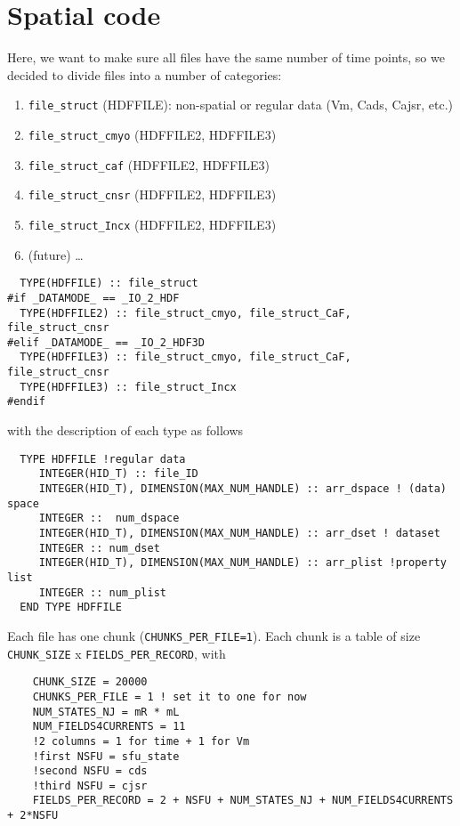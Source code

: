 \section{Spatial code}
\label{sec:IO_spatial}

Here, we want to make sure all files have the same number of time points, so we
decided to divide files into a number of categories:
\begin{enumerate}
  \item \verb!file_struct! (HDFFILE): non-spatial or regular data (Vm, Cads,
  Cajsr, etc.)
  \item \verb!file_struct_cmyo! (HDFFILE2, HDFFILE3)
  \item \verb!file_struct_caf! (HDFFILE2, HDFFILE3)
  \item \verb!file_struct_cnsr! (HDFFILE2, HDFFILE3)
  \item \verb!file_struct_Incx! (HDFFILE2, HDFFILE3)
  \item (future) \ldots 
\end{enumerate}
\begin{verbatim}
  TYPE(HDFFILE) :: file_struct
#if _DATAMODE_ == _IO_2_HDF  
  TYPE(HDFFILE2) :: file_struct_cmyo, file_struct_CaF, file_struct_cnsr
#elif _DATAMODE_ == _IO_2_HDF3D
  TYPE(HDFFILE3) :: file_struct_cmyo, file_struct_CaF, file_struct_cnsr
  TYPE(HDFFILE3) :: file_struct_Incx
#endif
\end{verbatim}
with the description of each type as follows
\begin{verbatim}
  TYPE HDFFILE !regular data
     INTEGER(HID_T) :: file_ID
     INTEGER(HID_T), DIMENSION(MAX_NUM_HANDLE) :: arr_dspace ! (data) space
     INTEGER ::  num_dspace
     INTEGER(HID_T), DIMENSION(MAX_NUM_HANDLE) :: arr_dset ! dataset
     INTEGER :: num_dset
     INTEGER(HID_T), DIMENSION(MAX_NUM_HANDLE) :: arr_plist !property list
     INTEGER :: num_plist
  END TYPE HDFFILE
\end{verbatim}

Each file has one chunk (\verb!CHUNKS_PER_FILE=1!). Each chunk is a table of
size \verb!CHUNK_SIZE! x \verb!FIELDS_PER_RECORD!, with
\begin{verbatim}
    CHUNK_SIZE = 20000
    CHUNKS_PER_FILE = 1 ! set it to one for now
    NUM_STATES_NJ = mR * mL
    NUM_FIELDS4CURRENTS = 11
    !2 columns = 1 for time + 1 for Vm
    !first NSFU = sfu_state
    !second NSFU = cds
    !third NSFU = cjsr
    FIELDS_PER_RECORD = 2 + NSFU + NUM_STATES_NJ + NUM_FIELDS4CURRENTS + 2*NSFU
\end{verbatim}
 

